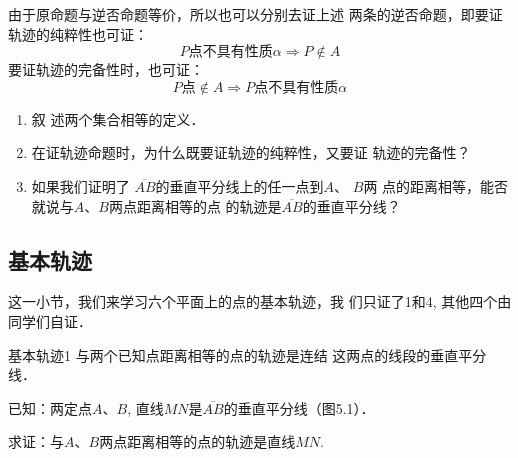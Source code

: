 由于原命题与逆否命题等价，所以也可以分别去证上述
两条的逆否命题，即要证轨迹的纯粹性也可证：
\[P\text{点不具有性质}\alpha\Rightarrow P\notin A\]
要证轨迹的完备性时，也可证：
\[P\text{点}\notin A\Rightarrow P\text{点不具有性质}\alpha\]

\begin{ex}
\begin{enumerate}
\item 叙
述两个集合相等的定义．
\item 在证轨迹命题时，为什么既要证轨迹的纯粹性，又要证
轨迹的完备性？
\item 如果我们证明了
$\overline{AB}$的垂直平分线上的任一点到$A$、
$B$两
点的距离相等，能否就说与$A$、$B$两点距离相等的点
的轨迹是$\overline{AB}$的垂直平分线？
\end{enumerate}
\end{ex}


\subsection{基本轨迹}
这一小节，我们来学习六个平面上的点的基本轨迹，我
们只证了1和4, 其他四个由同学们自证．

\begin{blk}{基本轨迹1}
与两个已知点距离相等的点的轨迹是连结
这两点的线段的垂直平分线．
\end{blk}

已知：两定点$A$、$B$, 直线$MN$是$\overline{AB}$的垂直平分线（图5.1）．

求证：与$A$、$B$两点距离相等的点的轨迹是直线$MN$.

\begin{figure}[htp]
    \centering
{}
    \caption{}
\end{figure}


